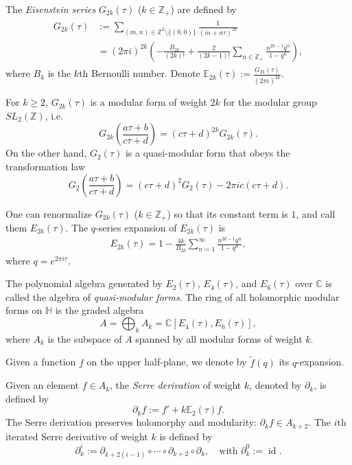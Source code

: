 \documentclass[9pt]{amsart}
\begin{document}
The {\em Eisenstein series} $G_{2k}(\tau)$ ($k \in \mathbb{Z}_+$) are defined by
\begin{align}
\begin{split}
G_{2k}(\tau) &:= \sum_{(m,n)\in \mathbb{Z}^2 \setminus \{(0,0)\}} \frac{1}{(m+n\tau)^{2k}} \\
             &= (2\pi i )^{2k} \left( -\frac{B_{2k}}{(2k)!} + \frac{2}{(2k-1)!} \sum_{n\in \mathbb{Z}_+} \frac{n^{2k-1} q^{n}}{1 - q^n} \right),
\end{split}
\end{align}
where $B_{k}$ is the $k$th Bernoulli number. Denote $\mathbb{E}_{2k}(\tau) := \frac{G_{2k}(\tau)}{(2\pi i)^{2k}}$.

For $k \geq 2$, $G_{2k}(\tau)$ is a modular form of weight $2k$ for the modular group $SL_2(\mathbb{Z})$, i.e.
\[
G_{2k}\left( \frac{a\tau + b}{c\tau + d} \right) = (c\tau + d)^{2k} G_{2k}(\tau).
\]
On the other hand, $G_2(\tau)$ is a quasi-modular form that obeys the transformation law
\[
G_2\left( \frac{a\tau + b}{c\tau + d} \right) = (c\tau + d)^2 G_2(\tau) - 2\pi i c (c\tau + d).
\]

One can renormalize $G_{2k}(\tau)$ ($k \in \mathbb{Z}_+$) so that its constant term is $1$, and call them $E_{2k}(\tau)$. The $q$-series expansion of $E_{2k}(\tau)$ is
\begin{align}
E_{2k}(\tau) = 1 - \frac{4k}{B_{2k}} \sum_{n=1}^{\infty} \frac{n^{2k-1} q^n}{1 - q^n},
\end{align}
where $q = e^{2\pi i \tau}$.

The polynomial algebra generated by $E_2(\tau)$, $E_4(\tau)$, and $E_6(\tau)$ over $\mathbb{C}$ is called the algebra of {\em quasi-modular forms}. The ring of all holomorphic modular forms on $\mathbb{H}$ is the graded algebra
\[
A = \bigoplus_{k} A_k = \mathbb{C}[E_4(\tau), E_6(\tau)],
\]
where $A_k$ is the subspace of $A$ spanned by all modular forms of weight $k$.

Given a function $f$ on the upper half-plane, we denote by $\tilde{f}(q)$ its $q$-expansion.


Given an element $f \in A_k$, the {\em Serre derivation} of weight $k$, denoted by $\partial_k$, is defined by
\[
\partial_k f := f' + k \mathbb{E}_2(\tau) f.
\]
The Serre derivation preserves holomorphy and modularity: $\partial_k f \in A_{k+2}$. The $i$th iterated Serre derivative of weight $k$ is defined by
\[
\partial_k^{i} := \partial_{k+2(i-1)} \circ \cdots \circ \partial_{k+2} \circ \partial_k, \quad \text{with } \partial_k^0 := \operatorname{id}.
\]
\end{document}
